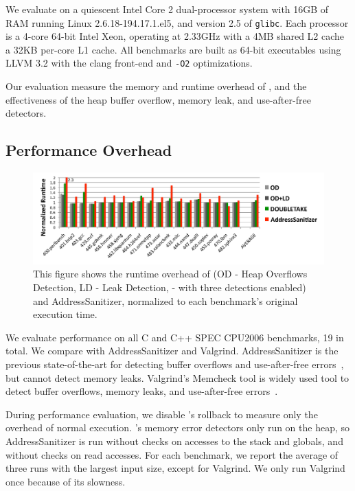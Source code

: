 \label{sec:evaluation}

We evaluate \doubletake{} on a quiescent Intel Core 2 dual-processor system with 16GB of RAM running Linux 2.6.18-194.17.1.el5, and version 2.5 of \texttt{glibc}. Each processor is a 4-core 64-bit Intel Xeon, operating at 2.33GHz with a 4MB shared L2 cache a 32KB per-core L1 cache. All benchmarks are built as 64-bit executables using LLVM 3.2 with the clang front-end and \texttt{-O2} optimizations.

Our evaluation measure the memory and runtime overhead of \doubletake{}, and the effectiveness of the heap buffer overflow, memory leak, and use-after-free detectors.

\subsection{Performance Overhead}
\label{sec:perf}

\begin{figure}[!ht]
	\begin{center}
		\includegraphics[width=6.5in]{doubletake/figure/perf}
	\end{center}
	\caption{This figure shows the runtime overhead of \doubletake{} (OD - Heap Overflows Detection, LD - Leak Detection, \doubletake{} - with three detections enabled) and AddressSanitizer, normalized to each benchmark's original execution time. 
\label{fig:perf}}
\end{figure}

We evaluate performance on all C and C++ SPEC CPU2006 benchmarks, 19 in total. We compare \doubletake{} with AddressSanitizer and Valgrind. AddressSanitizer is the previous state-of-the-art for detecting buffer overflows and use-after-free errors~\cite{AddressSanitizer}, but cannot detect memory leaks. Valgrind's Memcheck tool is widely used tool to detect buffer overflows, memory leaks, and use-after-free errors~\cite{overflow:valgrind}. 

During performance evaluation, we disable \doubletake{}'s rollback to measure only the overhead of normal execution. \doubletake{}'s memory error detectors only run on the heap, so AddressSanitizer is run without checks on accesses to the stack and globals, and without checks on read accesses. For each benchmark, we report the average of three runs with the largest input size, except for Valgrind. We only run Valgrind once because of its slowness. 

